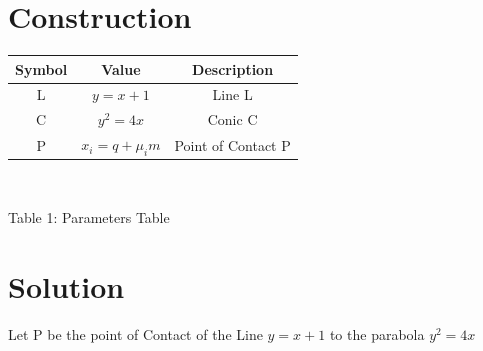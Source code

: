 \documentclass[journal,12pt,twocolumn]{IEEEtran}
\begin{document}
\section{Construction}
\vspace{0.25cm}
\raggedright
\centering
\begin{tabular}{|c|c|c|}
\hline
\textbf{Symbol} & \textbf{Value} & \textbf{Description}\\
\hline
L & $ y = x + 1 $ & Line L\\
\hline
C & $ y^2 = 4x$ & Conic C\\
\hline
P & $ x_i = q + \mu_i m$ & Point of Contact P\\
\hline
\end{tabular}\\
\vspace{0.2cm}
\centerline{Table 1: Parameters Table}
\section{Solution}
\raggedright
Let P be the point of Contact of the Line $y = x + 1$ to the parabola  $y^2 = 4x$\\

\vspace{0.25cm}
\end{document}
